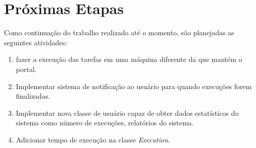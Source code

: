 \documentclass[tg]{mdtufsm}
\begin{document}
\chapter{Próximas Etapas}

Como continuação do trabalho realizado até o momento, são planejadas as seguintes atividades:

\begin{enumerate}
	\item fazer a execução das tarefas em uma máquina diferente da que mantém o portal.
	\item Implementar sistema de notificação ao usuário para quando execuções forem finalizadas.
	\item Implementar nova classe de usuário capaz de obter dados estatísticos do sistema como número de execuções, relatórios do sistema.
	\item Adicionar tempo de execução na classe \emph{Execution}.
\end{enumerate}

\setlength{\baselineskip}{\baselineskip}


\end{document}
